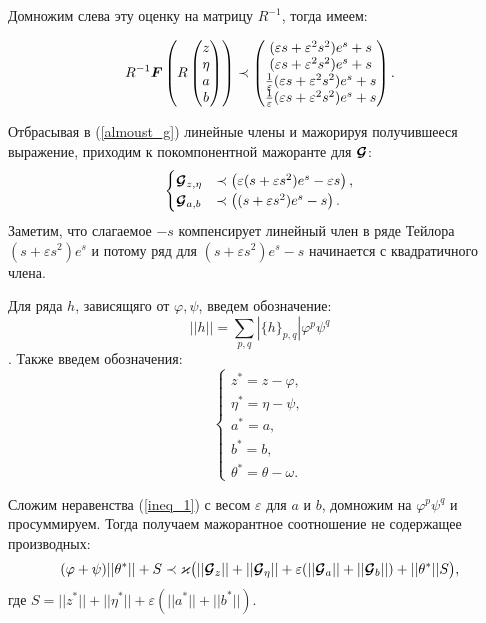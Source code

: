 Домножим слева эту оценку на матрицу $R^{-1}$, тогда имеем:

\begin{equation}
R^{-1} \boldsymbol{F} \left(R\begin{pmatrix}
z \\ \eta \\ a \\ b 
\end{pmatrix} \right) \prec
\begin{pmatrix}
(\varepsilon s + \varepsilon^2 s^2)e^{s} + s  \\ 
(\varepsilon s + \varepsilon^2 s^2)e^{s} + s  \\ 
\frac{1}{\varepsilon} (\varepsilon s + \varepsilon^2 s^2)e^{s} + s \\ 
\frac{1}{\varepsilon} (\varepsilon s + \varepsilon^2 s^2)e^{s} + s
\end{pmatrix}.
\label{almoust_g}
\end{equation}

Отбрасывая в (\ref{almoust_g}) линейные члены и мажорируя получившееся выражение, приходим к покомпонентной мажоранте для $\boldsymbol{\mathcal{G}}$:
\begin{equation}
\begin{cases}
\boldsymbol{\mathcal{G}}_{z,\eta} &\prec \left( \varepsilon (s + \varepsilon s^2)e^{s} - \varepsilon s \right), \\
\boldsymbol{\mathcal{G}}_{a,b}    &\prec \left( (s + \varepsilon s^2)e^{s} - s \right).
\label{res_g}
\end{cases}
\end{equation}
Заметим, что слагаемое $-s$ компенсирует линейный член в ряде Тейлора $(s + \varepsilon s^2)e^{s}$ и потому ряд для $(s + \varepsilon s^2)e^{s} - s$ начинается с квадратичного члена.

Для ряда $h$, зависящяго от $\varphi, \psi$, введем обозначение:
$$||h|| = \sum_{p,q} |\{h\}_{p,q}| \varphi^p \psi^q$$.
Также введем обозначения:
\begin{equation*}
\begin{cases}
z^* = z - \varphi,\\
\eta^* = \eta - \psi,\\
a^*=a,\\
b^*=b,\\
\theta^* = \theta - \omega.
\end{cases}
\end{equation*}

Сложим неравенства (\ref{ineq_1}) с весом $\varepsilon$ для $a$ и $b$, домножим на $\varphi^p \psi^q$ и просуммируем. Тогда получаем мажорантное соотношение не содержащее производных:
\begin{equation}
(\varphi+\psi) ||\theta^*|| + S  \prec \varkappa \big( ||\boldsymbol{\mathcal{G}}_z||+||\boldsymbol{\mathcal{G}}_\eta||+\varepsilon(||\boldsymbol{\mathcal{G}}_a||+||\boldsymbol{\mathcal{G}}_b||) + ||\theta^*||S \big),
\label{major_eq}
\end{equation}
где $S = ||z^*||+||\eta^*||+\varepsilon (||a^*||+||b^*||)$.

